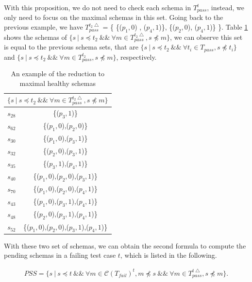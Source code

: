 With this proposition, we do not need to check each schema in $T_{pass}^{t}$, instead, we only need to focus on the maximal schemas in this set.   Going back to the previous example, we have $T_{pass}^{t_{2}\bigtriangleup}$ = \{ \{($p_{1}, 0$) , ($p_{4}, 1$)\}, \{($p_{2}, 0$), ($p_{4}, 1$)\} \}. Table \ref{ex:maximalhealthyintequal} shows the schemas of $\{ s\ |\ s \preceq t_{2}\ \&\&\ \forall m \in T_{pass}^{t_{2}\bigtriangleup}, s \npreceq m \}$, we can observe this set is equal to the previous schema sets, that are  $\{ s\ |\ s \preceq t_{2}\ \&\&\  \forall t_{i} \in T_{pass}, s \npreceq t_{i} \} $ and $\{ s\ |\ s \preceq t_{2}\ \&\&\ \forall m \in T_{pass}^{t_{2}}, s \npreceq m \}$, respectively.


 \begin{table}[htbp]
  \centering
  \caption{An example of the reduction to maximal healthy schemas}
  \label{ex:maximalhealthyintequal}
    \begin{tabular}{|c|c|} \hline
     \multicolumn{2}{|c|}{$\{ s\ |\ s \preceq t_{2}\ \&\&\ \forall m \in T_{pass}^{t_{2}\bigtriangleup}, s \npreceq m \}$} \\ \hline
   $s_{28}$ & \{($p_{3}, 1$)\} \\
   $s_{62}$ & \{($p_{1}, 0$),($p_{2}, 0$)\} \\
   $s_{30}$ & \{($p_{1}, 0$),($p_{3}, 1$)\} \\
   $s_{32}$ & \{($p_{2}, 0$),($p_{3}, 1$)\} \\
   $s_{35}$ & \{($p_{3}, 1$),($p_{4}, 1$)\} \\
   $s_{40}$ & \{($p_{1}, 0$),($p_{2}, 0$),($p_{3}, 1$)\} \\
   $s_{70}$ & \{($p_{1}, 0$),($p_{2}, 0$),($p_{4}, 1$)\} \\
   $s_{43}$ & \{($p_{1}, 0$),($p_{3}, 1$),($p_{4}, 1$)\} \\
   $s_{48}$ & \{($p_{2}, 0$),($p_{3}, 1$),($p_{4}, 1$)\} \\
   $s_{52}$ & \{($p_{1}, 0$),($p_{2}, 0$),($p_{3}, 1$),($p_{4}, 1$)\} \\ \hline
    \end{tabular}%
  \end{table}


With these two set of schemas, we can obtain the second formula to compute the pending schemas in a failing test case $t$, which is listed in the following.

\begin{equation}
\begin{aligned}\label{eq:pssfirst_mutated}
PSS=\{ s\ |\ s \preceq t\ \&\&\ \forall m \in \mathcal{C}(T_{fail})^{t},  m \npreceq s  \ \&\&\  \forall m \in T_{pass}^{t\bigtriangleup}, s \npreceq m \} .
\end{aligned}
\end{equation}

